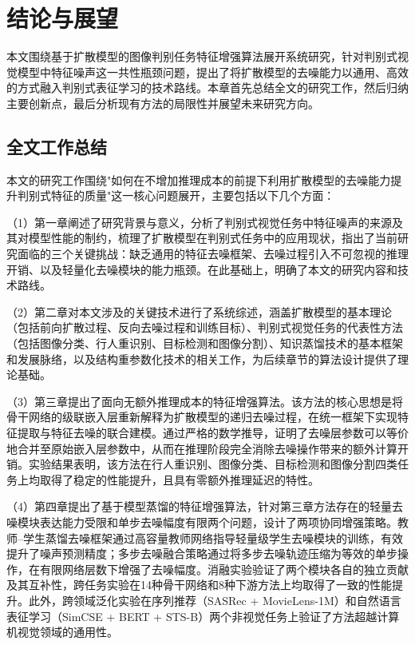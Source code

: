 ﻿\setlength{\baselineskip}{20pt}
\chapter{结论与展望}
\label{cha:chap5}

本文围绕基于扩散模型的图像判别任务特征增强算法展开系统研究，针对判别式视觉模型中特征噪声这一共性瓶颈问题，提出了将扩散模型的去噪能力以通用、高效的方式融入判别式表征学习的技术路线。本章首先总结全文的研究工作，然后归纳主要创新点，最后分析现有方法的局限性并展望未来研究方向。

\section{全文工作总结}

本文的研究工作围绕"如何在不增加推理成本的前提下利用扩散模型的去噪能力提升判别式特征的质量"这一核心问题展开，主要包括以下几个方面：

（1）第一章阐述了研究背景与意义，分析了判别式视觉任务中特征噪声的来源及其对模型性能的制约，梳理了扩散模型在判别式任务中的应用现状，指出了当前研究面临的三个关键挑战：缺乏通用的特征去噪框架、去噪过程引入不可忽视的推理开销、以及轻量化去噪模块的能力瓶颈。在此基础上，明确了本文的研究内容和技术路线。

（2）第二章对本文涉及的关键技术进行了系统综述，涵盖扩散模型的基本理论（包括前向扩散过程、反向去噪过程和训练目标）、判别式视觉任务的代表性方法（包括图像分类、行人重识别、目标检测和图像分割）、知识蒸馏技术的基本框架和发展脉络，以及结构重参数化技术的相关工作，为后续章节的算法设计提供了理论基础。

（3）第三章提出了面向无额外推理成本的特征增强算法。该方法的核心思想是将骨干网络的级联嵌入层重新解释为扩散模型的递归去噪过程，在统一框架下实现特征提取与特征去噪的联合建模。通过严格的数学推导，证明了去噪层参数可以等价地合并至原始嵌入层参数中，从而在推理阶段完全消除去噪操作带来的额外计算开销。实验结果表明，该方法在行人重识别、图像分类、目标检测和图像分割四类任务上均取得了稳定的性能提升，且具有零额外推理延迟的特性。

（4）第四章提出了基于模型蒸馏的特征增强算法，针对第三章方法存在的轻量去噪模块表达能力受限和单步去噪幅度有限两个问题，设计了两项协同增强策略。教师--学生蒸馏去噪框架通过高容量教师网络指导轻量级学生去噪模块的训练，有效提升了噪声预测精度；多步去噪融合策略通过将多步去噪轨迹压缩为等效的单步操作，在有限网络层数下增强了去噪幅度。消融实验验证了两个模块各自的独立贡献及其互补性，跨任务实验在14种骨干网络和8种下游方法上均取得了一致的性能提升。此外，跨领域泛化实验在序列推荐（SASRec + MovieLens-1M）和自然语言表征学习（SimCSE + BERT + STS-B）两个非视觉任务上验证了方法超越计算机视觉领域的通用性。

